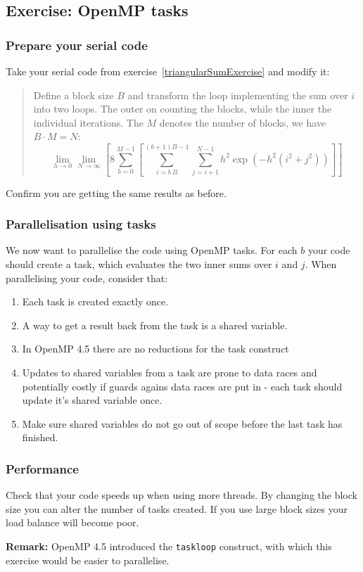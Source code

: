 \subsection{Exercise: OpenMP tasks}


\subsubsection{Prepare your serial code}
Take your serial code from exercise~\ref{triangularSumExercise} and modify it:
\begin{quote}
Define a block size $B$ and transform the loop implementing the sum over $i$ into two loops.  The outer on counting the blocks, while the inner the individual iterations.  The $M$ denotes the number of blocks, we have $B\cdot M= N$:
\begin{equation}
\lim_{h\to0}\lim_{N\to\infty}\left[
8\sum_{b=0}^{M-1}\left[\sum_{i=b\,B}^{(b+1)B-1}\sum_{j=i+1}^{N-1}
h^2 \exp\left(-h^2 (i^2 + j^2)
\right)\right]\right]
\end{equation}
\end{quote}
Confirm you are getting the same results as before.  
\subsubsection{Parallelisation using tasks}
We now want to parallelise the code using OpenMP tasks.  For each $b$ your code should create a task, which evaluates the two inner sums over $i$ and $j$. When parallelising your code, consider that:
\begin{enumerate}
\item Each task is created exactly once.
\item A way to get a result back from the task is a shared variable.
\item In OpenMP 4.5 there are no reductions for the task construct
\item Updates to shared variables from a task are prone to data races and potentially costly if guards agains data races are put in - each task should update it's shared variable once.
\item Make sure shared variables do not go out of scope before the last task has finished.
\end{enumerate}
\subsubsection{Performance}
Check that your code speeds up when using more threads.  By changing the block size you can alter the number of tasks created.  If you use large block sizes your load balance will become poor.  

\textbf{Remark:}
OpenMP 4.5 introduced the \verb+taskloop+ construct, with which this exercise would be easier to parallelise.


